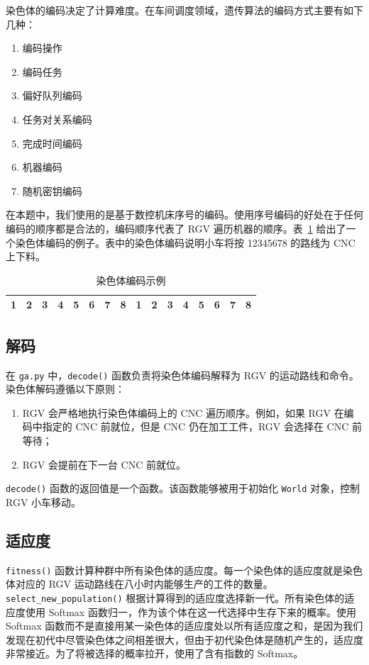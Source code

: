 \documentclass{cumcmthesis}
\begin{document}
	染色体的编码决定了计算难度。在车间调度领域，遗传算法的编码方式主要有如下几种：
	\begin{enumerate}
		\item 编码操作
		\item 编码任务
		\item 偏好队列编码
		\item 任务对关系编码
		\item 完成时间编码
		\item 机器编码
		\item 随机密钥编码
	\end{enumerate}
	在本题中，我们使用的是基于数控机床序号的编码。使用序号编码的好处在于任何编码的顺序都是合法的，编码顺序代表了 RGV 遍历机器的顺序。表~\ref{table:chromosome} 给出了一个染色体编码的例子。表中的染色体编码说明小车将按 12345678 的路线为 CNC 上下料。
	
	\begin{table}[!htbp]
		\centering
		\caption{染色体编码示例}
		\label{table:chromosome}
		\begin{tabular}{cccccccccccccccc}
	\toprule[1.5pt]
            1 & 2 & 3 & 4 & 5 & 6 & 7 & 8 & 1 & 2 & 3 & 4 & 5 & 6 & 7 & 8 \\
	\bottomrule[1.5pt]
	\end{tabular}
	\end{table}
	
	\subsection{解码}

	在 \texttt{ga.py} 中，\texttt{decode()} 函数负责将染色体编码解释为 RGV 的运动路线和命令。染色体解码遵循以下原则：
	\begin{enumerate}
		\item RGV 会严格地执行染色体编码上的 CNC 遍历顺序。例如，如果 RGV 在编码中指定的 CNC 前就位，但是 CNC 仍在加工工件，RGV 会选择在 CNC 前等待；
		\item RGV 会提前在下一台 CNC 前就位。
	\end{enumerate}
	\texttt{decode()} 函数的返回值是一个函数。该函数能够被用于初始化 \texttt{World} 对象，控制 RGV 小车移动。

	\subsection{适应度}

	\texttt{fitness()} 函数计算种群中所有染色体的适应度。每一个染色体的适应度就是染色体对应的 RGV 运动路线在八小时内能够生产的工件的数量。\texttt{select\_new\_population()} 根据计算得到的适应度选择新一代。所有染色体的适应度使用 Softmax 函数归一，作为该个体在这一代选择中生存下来的概率。使用 Softmax 函数而不是直接用某一染色体的适应度处以所有适应度之和，是因为我们发现在初代中尽管染色体之间相差很大，但由于初代染色体是随机产生的，适应度非常接近。为了将被选择的概率拉开，使用了含有指数的 Softmax。
\end{document}
